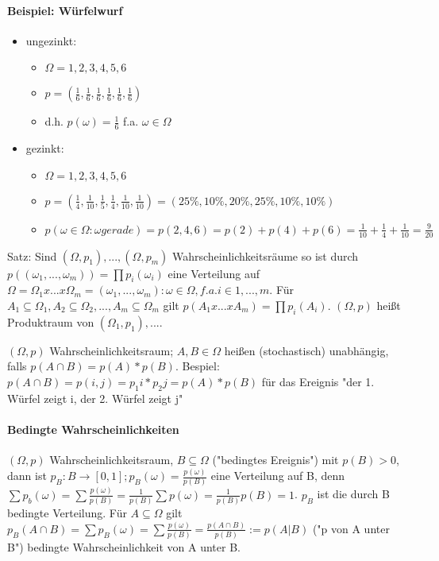\documentclass[10pt,landscape]{article}
\begin{document}
\begin{multicols}{3}
\paragraph{Beispiel: Würfelwurf} 
\begin{itemize}
    \item ungezinkt:
    \begin{itemize}
        \item $\Omega = {1,2,3,4,5,6}$
        \item $p=(\frac{1}{6},\frac{1}{6},\frac{1}{6},\frac{1}{6},\frac{1}{6},\frac{1}{6})$
        \item d.h. $p(\omega)=\frac{1}{6}$ f.a. $\omega \in \Omega$
    \end{itemize}
    \item gezinkt:
    \begin{itemize}
        \item $\Omega = {1,2,3,4,5,6}$
        \item $p=(\frac{1}{4}, \frac{1}{10}, \frac{1}{5}, \frac{1}{4}, \frac{1}{10}, \frac{1}{10})=(25\%, 10\%, 20\%, 25\%, 10\%, 10\%)$
        \item $p({\omega \in \Omega: \omega gerade})=p({2,4,6})=p(2)+p(4)+p(6)= \frac{1}{10}+ \frac{1}{4}+ \frac{1}{10} = \frac{9}{20}$
    \end{itemize}
\end{itemize}

Satz: Sind $(\Omega, p_1),...,(\Omega, p_m)$ Wahrscheinlichkeitsräume so ist durch $p((\omega_1,...,\omega_m))=\prod p_i(\omega_i)$ eine Verteilung auf $\Omega = \Omega_1 x ... x \Omega_m = {(\omega_1,...,\omega_m): \omega \in \Omega, f.a. i\in{1,...,m}}$. Für $A_1\subseteq \Omega_1, A_2\subseteq \Omega_2,...,A_m\subseteq \Omega_m$ gilt $p(A_1x...xA_m)=\prod p_i(A_i)$.
$(\Omega, p)$ heißt Produktraum von $(\Omega_1, p_1),...$.

$(\Omega, p)$ Wahrscheinlichkeitsraum; $A,B\in \Omega$ heißen (stochastisch) unabhängig, falls $p(A\cap B) = p(A)*p(B)$.
Bespiel: $p(A\cap B) = p({i,j}) =p_1{i}*p_2{j} = p(A)*p(B)$ für das Ereignis "der 1. Würfel zeigt i, der 2. Würfel zeigt j"

\paragraph{Bedingte Wahrscheinlichkeiten}
$(\Omega, p)$ Wahrscheinlichkeitsraum, $B\subseteq \Omega$ ("bedingtes Ereignis") mit $p(B)>0$, dann ist $p_B:B\rightarrow [0,1]; p_B(\omega)=\frac{p(\omega)}{p(B)}$ eine Verteilung auf B, denn $\sum p_b(\omega)=\sum \frac{p(\omega)}{p(B)}=\frac{1}{p(B)} \sum p(\omega)= \frac{1}{p(B)} p(B)= 1$.
$p_B$ ist die durch B bedingte Verteilung. Für $A\subseteq \Omega$ gilt $p_B(A\cap B)=\sum p_B(\omega)=\sum\frac{p(\omega)}{p(B)}= \frac{p(A\cap B)}{p(B)}:= p(A|B)$ ("p von A unter B") bedingte Wahrscheinlichkeit von A unter B.


\end{multicols}
\end{document}
